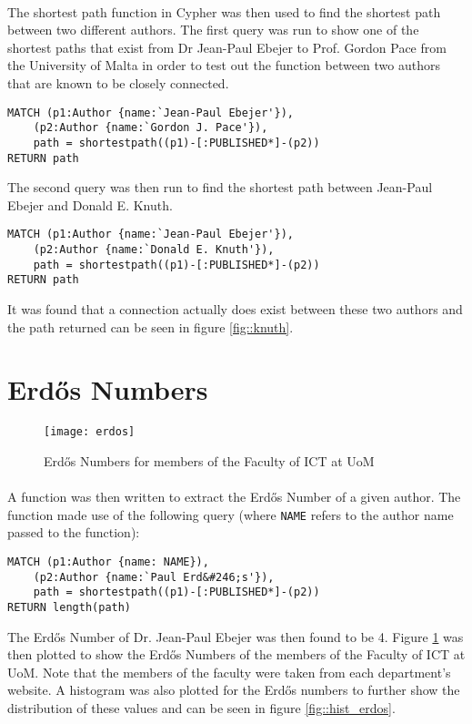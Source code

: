 \paragraph{ }The shortest path function in Cypher was then used to find the shortest path between two different authors. The first query was run to show one of the shortest paths that exist from Dr Jean-Paul Ebejer to Prof. Gordon Pace from the University of Malta in order to test out the function between two authors that are known to be closely connected.
\begin{verbatim}
MATCH (p1:Author {name:`Jean-Paul Ebejer'}),
    (p2:Author {name:`Gordon J. Pace'}),
    path = shortestpath((p1)-[:PUBLISHED*]-(p2))
RETURN path
\end{verbatim}
The second query was then run to find the shortest path between Jean-Paul Ebejer and Donald E. Knuth.
\begin{verbatim}
MATCH (p1:Author {name:`Jean-Paul Ebejer'}),
    (p2:Author {name:`Donald E. Knuth'}),
    path = shortestpath((p1)-[:PUBLISHED*]-(p2))
RETURN path
\end{verbatim}
It was found that a connection actually does exist between these two authors and the path returned can be seen in figure \ref{fig::knuth}.

\section{Erd\H{o}s Numbers}

\begin{figure}[!b]
	\centering
	\texttt{[image: erdos]}
	\caption[Erd\H{o}s Numbers]{Erd\H{o}s Numbers for members of the Faculty of ICT at UoM}
	\label{fig::erdos}
\end{figure}

\paragraph{ }A function was then written to extract the Erd\H{o}s Number of a given author. The function made use of the following query (where \texttt{NAME} refers to the author name passed to the function):
\begin{verbatim}
MATCH (p1:Author {name: NAME}),
    (p2:Author {name:`Paul Erd&#246;s'}),
    path = shortestpath((p1)-[:PUBLISHED*]-(p2))
RETURN length(path)
\end{verbatim} 
The Erd\H{o}s Number of Dr. Jean-Paul Ebejer was then found to be 4. Figure \ref{fig::erdos} was then plotted to show the Erd\H{o}s Numbers of the members of the Faculty of ICT at UoM. Note that the members of the faculty were taken from each department's website. A histogram was also plotted for the Erd\H{o}s numbers to further show the distribution of these values and can be seen in figure \ref{fig::hist_erdos}.

